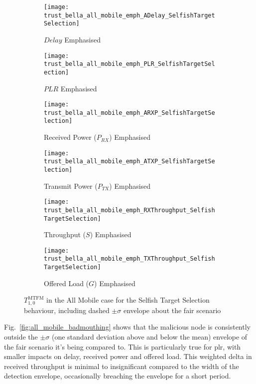 \begin{figure}[h]
	\centering
	\begin{subfigure}{0.45\textwidth}	
		\texttt{[image: trust\_bella\_all\_mobile\_emph\_ADelay\_SelfishTargetSelection]} 
		\caption{$Delay$ Emphasised}
		\label{fig:all_mobile_selfish_delay}
	\end{subfigure}
	\begin{subfigure}{0.45\textwidth}	
		\texttt{[image: trust\_bella\_all\_mobile\_emph\_PLR\_SelfishTargetSelection]}
		\caption{$PLR$ Emphasised}
		\label{fig:all_mobile_selfish_plr}
	\end{subfigure}
	
	\begin{subfigure}{0.45\textwidth}	
		\texttt{[image: trust\_bella\_all\_mobile\_emph\_ARXP\_SelfishTargetSelection]}
		\caption{Received Power ($P_{RX}$) Emphasised}
		\label{fig:all_mobile_selfish_rxp}
	\end{subfigure}
	\begin{subfigure}{0.45\textwidth}
		\texttt{[image: trust\_bella\_all\_mobile\_emph\_ATXP\_SelfishTargetSelection]}
		\caption{Transmit Power ($P_{TX}$) Emphasised}
		\label{fig:all_mobile_selfish_txp}
	\end{subfigure}
	
	\begin{subfigure}{0.45\textwidth}
		\texttt{[image: trust\_bella\_all\_mobile\_emph\_RXThroughput\_SelfishTargetSelection]} 
		\caption{Throughput ($S$) Emphasised}
		\label{fig:all_mobile_selfish_rxthroughput}
	\end{subfigure}
	\begin{subfigure}{0.45\textwidth}
		\texttt{[image: trust\_bella\_all\_mobile\_emph\_TXThroughput\_SelfishTargetSelection]} 
		\caption{Offered Load ($G$) Emphasised}
		\label{fig:all_mobile_selfish_txthroughput}
	\end{subfigure}
	\caption{$T_{1,0}^\text{MTFM}$ in the All Mobile case for the Selfish Target Selection behaviour, including dashed $\pm\sigma$ envelope about the fair scenario}
	\label{fig:all_mobile_selfish}
\end{figure}


Fig.~\ref{fig:all_mobile_badmouthing} shows that the malicious node is consistently outside the $\pm\sigma$ (one standard deviation above and below the mean) envelope of the fair scenario it's being compared to.
This is particularly true for \gls{plr}, with smaller impacts on delay, received power and offered load. 
This weighted delta in received throughput is minimal to insignificant compared to the width of the detection envelope, occasionally breaching the envelope for a short period. 

